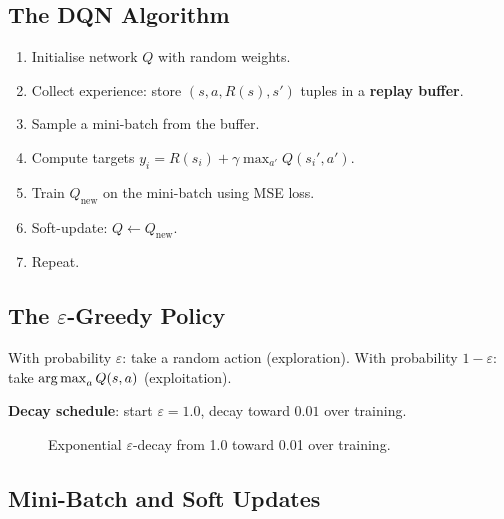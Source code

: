 \subsection{The DQN Algorithm}

\begin{enumerate}
\item Initialise network $Q$ with random weights.
\item Collect experience: store $(s,a,R(s),s')$ tuples in a
  \textbf{replay buffer}.
\item Sample a mini-batch from the buffer.
\item Compute targets $y_i=R(s_i)+\gamma\max_{a'}Q(s_i',a')$.
\item Train $Q_{\text{new}}$ on the mini-batch using MSE loss.
\item Soft-update: $Q\leftarrow Q_{\text{new}}$.
\item Repeat.
\end{enumerate}

\subsection{The $\varepsilon$-Greedy Policy}

With probability $\varepsilon$: take a random action (exploration).
With probability $1-\varepsilon$: take $\operatorname*{arg\,max}_a Q(s,a)$ (exploitation).

\textbf{Decay schedule}: start $\varepsilon=1.0$, decay toward $0.01$ over
training.

\begin{figure}[h]
\centering
{}
\caption{Exponential $\varepsilon$-decay from 1.0 toward 0.01 over training.}
\label{fig:eps-decay}
\end{figure}

\subsection{Mini-Batch and Soft Updates}

